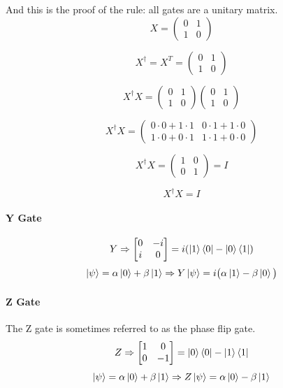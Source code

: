 \documentclass{article}
\begin{document}
And this is the proof of the rule: all gates are a unitary matrix.
\[
X = \begin{pmatrix} 0 & 1 \\ 1 & 0 \end{pmatrix}
\]

\[
X^\dagger = X^T = \begin{pmatrix} 0 & 1 \\ 1 & 0 \end{pmatrix}
\]

\[
X^\dagger X = \begin{pmatrix} 0 & 1 \\ 1 & 0 \end{pmatrix} \begin{pmatrix} 0 & 1 \\ 1 & 0 \end{pmatrix}
\]

\[
X^\dagger X = \begin{pmatrix} 0 \cdot 0 + 1 \cdot 1 & 0 \cdot 1 + 1 \cdot 0 \\ 1 \cdot 0 + 0 \cdot 1 & 1 \cdot 1 + 0 \cdot 0 \end{pmatrix}
\]

\[
X^\dagger X = \begin{pmatrix} 1 & 0 \\ 0 & 1 \end{pmatrix} = I
\]

\[
X^\dagger X = I
\]

\vspace{0.5cm}
\paragraph{Y Gate}
\begin{equation*}
    Y \Rightarrow \begin{bmatrix} 0 & -i \\ i & 0 \end{bmatrix} = i(\ket{1}\bra{0} - \ket{0}\bra{1})
\end{equation*}
\begin{equation*}
  \ket{\psi} = \alpha\ket{0} + \beta\ket{1} \Rightarrow Y\ket{\psi} = i\big(\alpha\ket{1} - \beta\ket{0}\big)
\end{equation*}
\vspace{0.5cm}
\paragraph{Z Gate}
The Z gate is sometimes referred to as the phase flip gate.
\begin{equation*}
    Z \Rightarrow \begin{bmatrix} 1 & 0 \\ 0 & -1 \end{bmatrix} = \ket{0}\bra{0} - \ket{1}\bra{1}
\end{equation*}
\begin{equation*}
  \ket{\psi} = \alpha\ket{0} + \beta\ket{1} \Rightarrow Z\ket{\psi} = \alpha\ket{0} - \beta\ket{1}
\end{equation*}
\vspace{0.5cm}
\end{document}
